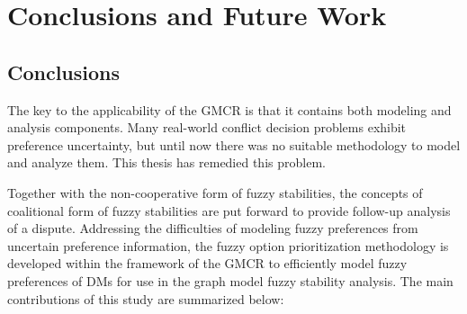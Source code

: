 \chapter{Conclusions and Future Work}
\section{Conclusions}\label{sec-concl}

The key to the applicability of the GMCR is that it contains both modeling and analysis components. Many real-world conflict decision problems exhibit preference uncertainty, but until now there was no suitable methodology to model and analyze them. This thesis has remedied this problem.

Together with the non-cooperative form of fuzzy stabilities, the concepts of coalitional form of fuzzy stabilities are put forward to provide follow-up analysis of a dispute. Addressing the difficulties of modeling fuzzy preferences from uncertain preference information, the fuzzy option prioritization methodology is developed within the framework of the GMCR to efficiently model fuzzy preferences of DMs for use in the graph model fuzzy stability analysis. The main contributions of this study are summarized below:

